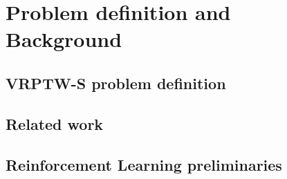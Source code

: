 \documentclass[preprint,12pt]{elsarticle}
\begin{document}
\section{Problem definition and Background}
\label{sec:background}

\subsection{VRPTW-S problem definition}


\subsection{Related work}

\subsection{Reinforcement Learning preliminaries}
\end{document}
